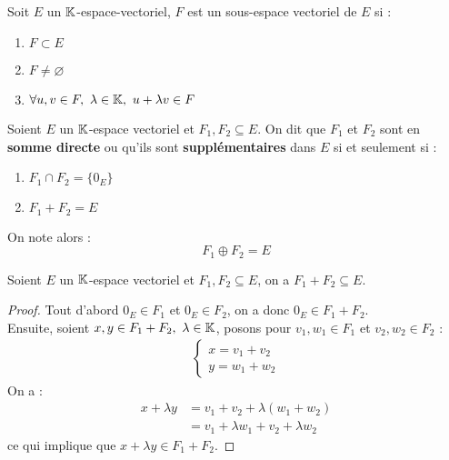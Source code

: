 \begin{definition}
	Soit $E$ un $\mathbb{K}$-espace-vectoriel, $F$ est un sous-espace vectoriel de $E$ si :
	\begin{enumerate}
    		\item $F \subset E$
    		\item $F \neq \varnothing$
    		\item $\forall u, v \in F,\ \lambda \in \K,\ u + \lambda v \in F$
    	\end{enumerate}
\end{definition}

\begin{definition}
	Soient $E$ un $\mathbb{K}$-espace vectoriel et $F_1, F_2 \subseteq E$. On dit que $F_1$ et $F_2$ sont en \textbf{somme directe} ou qu'ils sont \textbf{supplémentaires} dans $E$ si et seulement si :
	\begin{multicols}{2}
	    \begin{enumerate}
		\item $F_1 \cap F_2 = \{ 0_E \}$
		\item $F_1 + F_2 = E$
	\end{enumerate}
	\end{multicols}
	On note alors :
	\[ F_1 \oplus F_2 = E \]
\end{definition}

\begin{proposition}
	Soient $E$ un $\mathbb{K}$-espace vectoriel et $F_1, F_2 \subseteq E$, on a $F_1 + F_2 \subseteq E$. 
\end{proposition}

\begin{proof}
	Tout d'abord $0_E \in F_1$ et $0_E \in F_2$, on a donc $0_E \in F_1 + F_2$.
	\\
	Ensuite, soient $x, y \in F_1 + F_2,\ \lambda \in \mathbb{K}$, posons pour $v_1, w_1 \in F_1$ et $v_2, w_2 \in F_2$ :
	\begin{align*}
		\begin{cases}
			x = v_1 + v_2 \\
			y = w_1 + w_2
		\end{cases}
	\end{align*}
	On a :
	\begin{align*}
		x + \lambda y &= v_1 + v_2 + \lambda (w_1 + w_2) \\
		&= v_1 + \lambda w_1 + v_2 + \lambda w_2
	\end{align*}
	ce qui implique que $x + \lambda y \in F_1 + F_2$.
\end{proof}

